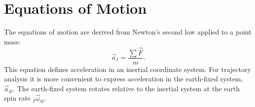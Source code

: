 \section{Equations of Motion}\label{sec:equations-of-motion}

The equations of motion are derived from Newton's second law applied to a point
mass:
\begin{equation}
  \vec a_I=\frac{\sum\vec F}{m}.
  \label{eq:newton-point-mass}
\end{equation}
This equation defines acceleration in an inertial coordinate system. For trajectory
analysis it is more convenient to express acceleration in the earth-fixed system,
$\vec a_{\oplus}$. The earth-fixed system rotates relative to the inertial system at
the earth spin rate ${}_{I}\vec\omega_{\oplus}$.

